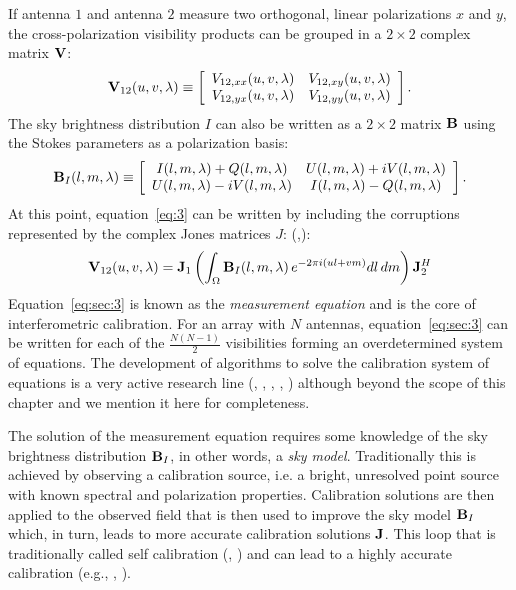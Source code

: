 If antenna $1$ and antenna $2$ measure two orthogonal, linear polarizations $x$ and $y$, the cross-polarization visibility products can be grouped in a $2 \times 2$ complex matrix ${\bf V}$:
\begin{equation}
    {\bf V}_{12} (u,v,\lambda) \equiv 
    \left[ 
    \begin{array}{cc}
    V_{12,xx} (u,v,\lambda) & V_{12,xy} (u,v,\lambda) \\
    V_{12,yx} (u,v,\lambda) & V_{12,yy} (u,v,\lambda) \\
    \end{array}
    \right].   
\label{eq:sec:1}
\end{equation} 
The sky brightness distribution $I$ can also be written as a $2 \times 2$ matrix ${\bf B}$ using the Stokes parameters as a polarization basis:
\begin{equation}
    {\bf B}_I (l,m,\lambda) \equiv 
    \left[
    \begin{array}{cc}
    I (l,m,\lambda) + Q (l,m,\lambda) & U (l,m,\lambda) + iV (l,m,\lambda) \\
    U (l,m,\lambda) - iV (l,m,\lambda) & I (l,m,\lambda) - Q (l,m,\lambda) \\
    \end{array}
    \right].   
\label{eq:sec:2}
\end{equation} 
At this point, equation~\ref{eq:3} can be written by including the corruptions represented by the complex Jones matrices $J$: (\cite{hamaker96},\cite{smirnov11}):
\begin{equation}
{\bf V}_{12} (u,v,\lambda) = {\bf J}_1 \left( \int_\Omega {\bf B}_I (l, m, \lambda) \, e^{-2 \pi i (ul + vm)} dl \, dm  \right) {\bf J}_2^H
\label{eq:sec:3}
\end{equation} 
Equation~\ref{eq:sec:3} is known as the {\it measurement equation} and is the core of interferometric calibration. For an array with $N$ antennas, equation~\ref{eq:sec:3} can be written for each of the $\frac{N (N - 1)}{2}$ visibilities forming an overdetermined system of equations. The development of  algorithms to solve the calibration system of equations is a very active research line (\cite{mitchell08}, \cite{kazemi11}, \cite{tasse14}, \cite{yatawatta15}, \cite{smirnov15}) although beyond the scope of this chapter and we mention it here for completeness.

The solution of the measurement equation requires some knowledge of the sky brightness distribution ${\bf B}_I$, in other words, a {\it sky model}. Traditionally this is achieved by observing a calibration source, i.e. a bright, unresolved point source with known spectral and polarization properties. Calibration solutions are then applied to the observed field that is then used to improve the sky model ${\bf B}_I$ which, in turn, leads to more accurate calibration solutions ${\bf J}$. This loop that is traditionally called self calibration (\cite{cornwell81}, \cite{pearson84}) and can lead to a highly accurate calibration (e.g., \cite{bernardi10}, \cite{smirnov11b}).

